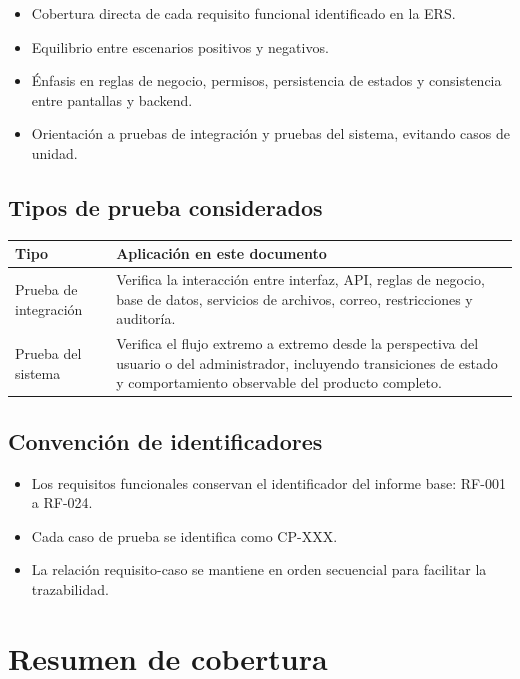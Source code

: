 \documentclass[12pt]{article}
\begin{document}
\begin{itemize}[leftmargin=1.2cm]
    \item Cobertura directa de cada requisito funcional identificado en la ERS.
    \item Equilibrio entre escenarios positivos y negativos.
    \item \'Enfasis en reglas de negocio, permisos, persistencia de estados y consistencia entre pantallas y backend.
    \item Orientaci\'on a pruebas de integraci\'on y pruebas del sistema, evitando casos de unidad.
\end{itemize}

\subsection{Tipos de prueba considerados}

\begin{longtable}{|P{3.2cm}|P{11.2cm}|}
\hline
{}
\textbf{Tipo} & \textbf{Aplicaci\'on en este documento} \\
\hline
Prueba de integraci\'on & Verifica la interacci\'on entre interfaz, API, reglas de negocio, base de datos, servicios de archivos, correo, restricciones y auditor\'ia. \\
\hline
Prueba del sistema & Verifica el flujo extremo a extremo desde la perspectiva del usuario o del administrador, incluyendo transiciones de estado y comportamiento observable del producto completo. \\
\hline
\end{longtable}

\subsection{Convenci\'on de identificadores}

\begin{itemize}[leftmargin=1.2cm]
    \item Los requisitos funcionales conservan el identificador del informe base: RF-001 a RF-024.
    \item Cada caso de prueba se identifica como CP-XXX.
    \item La relaci\'on requisito-caso se mantiene en orden secuencial para facilitar la trazabilidad.
\end{itemize}

\section{Resumen de cobertura}
\end{document}
